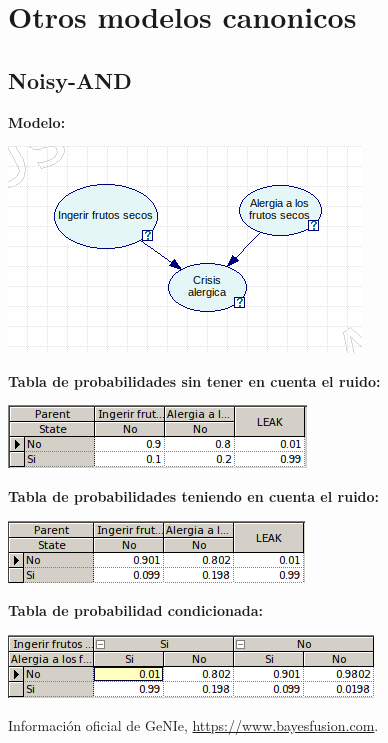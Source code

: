 \documentclass{article}
\begin{document}
\section{Otros modelos canonicos}

\subsection{\textbf{Noisy-AND}}

\textbf{Modelo:}

\begin{center}
\includegraphics[scale=0.5]{and.png}
\end{center}

\textbf{Tabla de probabilidades sin tener en cuenta el ruido:}

\begin{center}
\includegraphics[scale=0.5]{and1.png}
\end{center}

\textbf{Tabla de probabilidades teniendo en cuenta el ruido:}

\begin{center}
\includegraphics[scale=0.5]{and2.png}
\end{center}

\textbf{Tabla de probabilidad condicionada:}

\begin{center}
\includegraphics[scale=0.5]{and3.png}
\end{center}

\begin{thebibliography}{9}
 Información oficial de GeNIe, \url{https://www.bayesfusion.com}.
\end{thebibliography}
\end{document}
